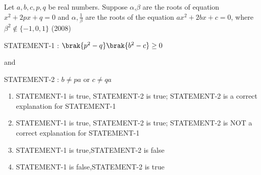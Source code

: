\iffalse
  \title{Assignment}
  \author{AI24BTECH11022 - Pabbuleti Venkata Charan Teja}
  \section{ar}
\fi

\item 
Let $a,b,c,p,q$ be real numbers. Suppose $\alpha$,$\beta$ are the roots of equation ${x^{2}+2px+q=0}$ and $\alpha,\frac{1}{\beta}$ are the roots of  the equation ${ax^{2}+2bx+c=0}$, where $\beta^{2}\not\in\{-1,0,1\}$ \hfill(2008)

STATEMENT-1 : $\brak{p^{2}-q}\brak{b^{2}-c}\geq0$

and

STATEMENT-2 : $b\neq pa$ or $c\neq qa$
\begin{enumerate}
\item
STATEMENT-1 is true, STATEMENT-2 is true; STATEMENT-2 is a correct explanation for STATEMENT-1
\item 
STATEMENT-1 is true, STATEMENT-2 is true; STATEMENT-2 is NOT a correct explanation for STATEMENT-1
\item
STATEMENT-1 is true,STATEMENT-2 is false
\item
STATEMENT-1 is false,STATEMENT-2 is true 
\end{enumerate}
